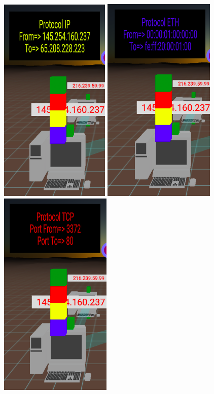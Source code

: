\documentclass[a4paper, 12pt]{book}
\begin{document}
\begin{itemize}
\begin{figure}[h]
\centering
    \includegraphics[scale=0.45]{img/capa_ip.png}
    \includegraphics[scale=0.45]{img/capa_eth.png}
    \includegraphics[scale=0.45]{img/capa_tcp.png}

\end{figure}
\end{itemize}
\end{document}
